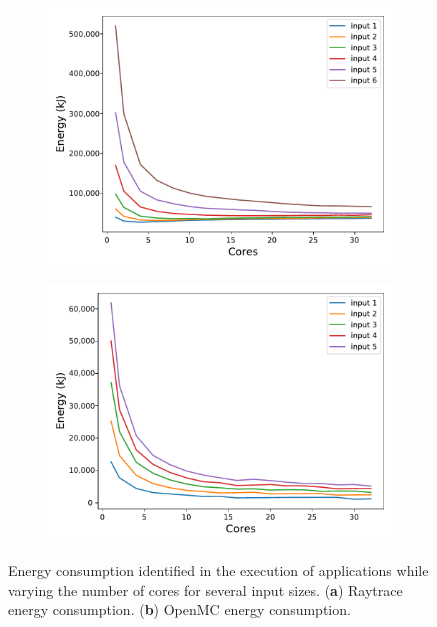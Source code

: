 \unskip
\begin{figure}[H]
	\begin{subfigure}[b]{0.46\textwidth}
		\includegraphics[width=\textwidth]{pascalanalyzer/figures/results/energy_completo_rtview_2 (1).pdf}
		\caption{\centering}
		\label{fig:raytrace_en}
	\end{subfigure}
	\begin{subfigure}[b]{0.46\textwidth}
		\includegraphics[width=\textwidth]{pascalanalyzer/figures/results/energy_completo_openmc_kernel_novo (1).pdf}
		\caption{\centering}
		\label{fig:openmc_en}
	\end{subfigure}
	
	\caption{Energy consumption identified in the execution of applications while varying the number of cores for several input sizes.
		(\textbf{a}) Raytrace energy consumption. (\textbf{b}) OpenMC energy consumption.}
	\label{fig:energy}
\end{figure}
